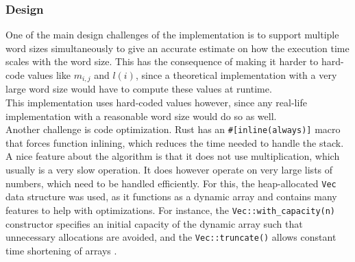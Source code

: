 \subsubsection{Design}
One of the main design challenges of the implementation is to support multiple word sizes simultaneously to give an accurate estimate on how the execution time scales with the word size. This has the consequence of making it harder to hard-code values like $m_{i, j}$ and $l(i)$, since a theoretical implementation with a very large word size would have to compute these values at runtime.\\
This implementation uses hard-coded values however, since any real-life implementation with a reasonable word size would do so as well.\\
Another challenge is code optimization. Rust has an \texttt{\#[inline(always)]} macro that forces function inlining, which reduces the time needed to handle the stack.
A nice feature about the algorithm is that it does not use multiplication, which usually is a very slow operation. It does however operate on very large lists of numbers, which need to be handled efficiently. For this, the heap-allocated \texttt{Vec} data structure was used, as it functions as a dynamic array and contains many features to help with optimizations. For instance, the \texttt{Vec::with\_capacity(n)} constructor specifies an initial capacity of the dynamic array such that unnecessary allocations are avoided, and the \texttt{Vec::truncate()} allows constant time shortening of arrays \cite{rust-lang}.\\

